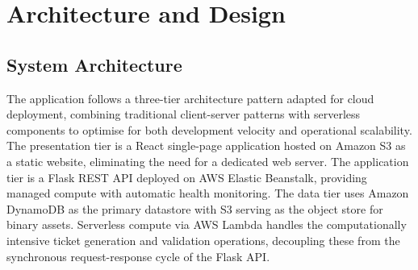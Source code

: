 \documentclass[conference]{IEEEtran}
\begin{document}
\section{Architecture and Design}

\subsection{System Architecture}

The application follows a three-tier architecture pattern adapted for cloud deployment, combining traditional client-server patterns with serverless components to optimise for both development velocity and operational scalability. The presentation tier is a React single-page application hosted on Amazon S3 as a static website, eliminating the need for a dedicated web server. The application tier is a Flask REST API deployed on AWS Elastic Beanstalk, providing managed compute with automatic health monitoring. The data tier uses Amazon DynamoDB as the primary datastore with S3 serving as the object store for binary assets. Serverless compute via AWS Lambda handles the computationally intensive ticket generation and validation operations, decoupling these from the synchronous request-response cycle of the Flask API.
\end{document}
